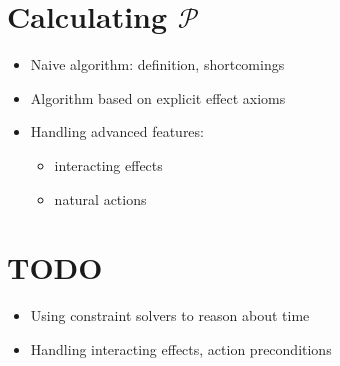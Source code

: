 \section{Calculating $\mathcal{P}$}

\begin{itemize}
\item Naive algorithm: definition, shortcomings
\item Algorithm based on explicit effect axioms
\item Handling advanced features:
  \begin{itemize}
  \item interacting effects
  \item natural actions
  \end{itemize}
\end{itemize}

\section{TODO}
\begin{itemize}
\item Using constraint solvers to reason about time
\item Handling interacting effects, action preconditions
\end{itemize}

